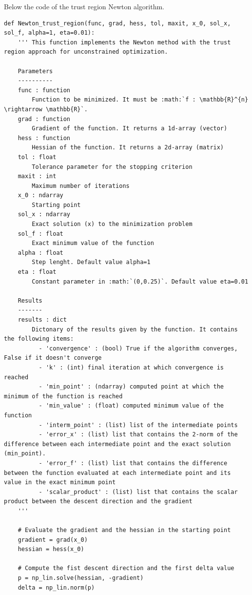 \documentclass[a4paper,11pt]{article}
\begin{document}
\noindent Below the code of the trust region Newton algorithm.


\begin{verbatim}
def Newton_trust_region(func, grad, hess, tol, maxit, x_0, sol_x, sol_f, alpha=1, eta=0.01):
    ''' This function implements the Newton method with the trust region approach for unconstrained optimization.

    Parameters
    ----------
    func : function
        Function to be minimized. It must be :math:`f : \mathbb{R}^{n} \rightarrow \mathbb{R}`.
    grad : function
        Gradient of the function. It returns a 1d-array (vector)
    hess : function
        Hessian of the function. It returns a 2d-array (matrix)
    tol : float
        Tolerance parameter for the stopping criterion
    maxit : int
        Maximum number of iterations
    x_0 : ndarray
        Starting point
    sol_x : ndarray
        Exact solution (x) to the minimization problem
    sol_f : float
        Exact minimum value of the function
    alpha : float
        Step lenght. Default value alpha=1
    eta : float
        Constant parameter in :math:`(0,0.25)`. Default value eta=0.01
        
    Results
    -------
    results : dict
        Dictonary of the results given by the function. It contains the following items:
          - 'convergence' : (bool) True if the algorithm converges, False if it doesn't converge
          - 'k' : (int) final iteration at which convergence is reached
          - 'min_point' : (ndarray) computed point at which the minimum of the function is reached
          - 'min_value' : (float) computed minimum value of the function
          - 'interm_point' : (list) list of the intermediate points
          - 'error_x' : (list) list that contains the 2-norm of the difference between each intermediate point and the exact solution (min_point). 
          - 'error_f' : (list) list that contains the difference between the function evaluated at each intermediate point and its value in the exact minimum point
          - 'scalar_product' : (list) list that contains the scalar product between the descent direction and the gradient
    '''

    # Evaluate the gradient and the hessian in the starting point
    gradient = grad(x_0)
    hessian = hess(x_0)

    # Compute the fist descent direction and the first delta value
    p = np_lin.solve(hessian, -gradient)
    delta = np_lin.norm(p)


\end{verbatim}
\end{document}
